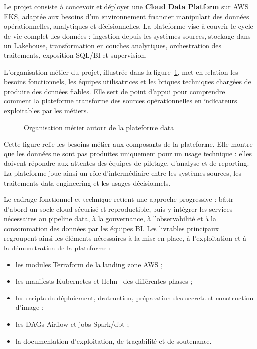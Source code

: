 Le projet consiste à concevoir et déployer une \textbf{Cloud Data Platform} sur AWS EKS, adaptée aux besoins d'un environnement financier manipulant des données opérationnelles, analytiques et décisionnelles. La plateforme vise à couvrir le cycle de vie complet des données : ingestion depuis les systèmes sources, stockage dans un Lakehouse, transformation en couches analytiques, orchestration des traitements, exposition SQL/BI et supervision.

L'organisation métier du projet, illustrée dans la figure~\ref{fig:organisation-metier}, met en relation les besoins fonctionnels, les équipes utilisatrices et les briques techniques chargées de produire des données fiables. Elle sert de point d'appui pour comprendre comment la plateforme transforme des sources opérationnelles en indicateurs exploitables par les métiers.

\begin{figure}[H]
\centering
{\setlength{\fboxsep}{3pt}\setlength{\fboxrule}{0.5pt}%
}
\caption{Organisation métier autour de la plateforme data}
\label{fig:organisation-metier}
\end{figure}

Cette figure relie les besoins métier aux composants de la plateforme. Elle montre que les données ne sont pas produites uniquement pour un usage technique : elles doivent répondre aux attentes des équipes de pilotage, d'analyse et de reporting. La plateforme joue ainsi un rôle d'intermédiaire entre les systèmes sources, les traitements data engineering et les usages décisionnels.

Le cadrage fonctionnel et technique retient une approche progressive : bâtir d'abord un socle cloud sécurisé et reproductible, puis y intégrer les services nécessaires au pipeline data, à la gouvernance, à l'observabilité et à la consommation des données par les équipes BI. Les livrables principaux regroupent ainsi les éléments nécessaires à la mise en place, à l'exploitation et à la démonstration de la plateforme :
\begin{itemize}
    \item les modules Terraform de la landing zone AWS ;
    \item les manifests Kubernetes et Helm~\cite{helm} des différentes phases ;
    \item les scripts de déploiement, destruction, préparation des secrets et construction d'image ;
    \item les DAGs Airflow et jobs Spark/dbt ;
    \item la documentation d'exploitation, de traçabilité et de soutenance.
\end{itemize}

